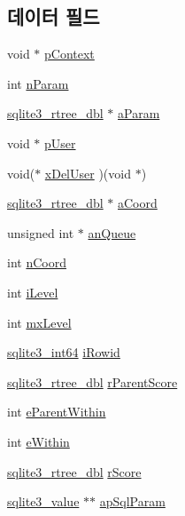 \subsection*{데이터 필드}
\begin{DoxyCompactItemize}
\item 
void $\ast$ \hyperlink{structsqlite3__rtree__query__info_a21e4964ceeddedce2211c8a75067936d}{p\+Context}
\item 
int \hyperlink{structsqlite3__rtree__query__info_a9df4acb109f572455c8e2fb443027157}{n\+Param}
\item 
\hyperlink{sqlite3_8h_ae9156ff58620c1ceae9391f1afabae1b}{sqlite3\+\_\+rtree\+\_\+dbl} $\ast$ \hyperlink{structsqlite3__rtree__query__info_a61352eac82151fee3e4c7ff718612179}{a\+Param}
\item 
void $\ast$ \hyperlink{structsqlite3__rtree__query__info_a7c1d4f1f20c14b88c4dc02643e6706a0}{p\+User}
\item 
void($\ast$ \hyperlink{structsqlite3__rtree__query__info_a23bcc6df883995d42d65449a27f45f85}{x\+Del\+User} )(void $\ast$)
\item 
\hyperlink{sqlite3_8h_ae9156ff58620c1ceae9391f1afabae1b}{sqlite3\+\_\+rtree\+\_\+dbl} $\ast$ \hyperlink{structsqlite3__rtree__query__info_a9d6e605e62fcf49d57dfc0d192076542}{a\+Coord}
\item 
unsigned int $\ast$ \hyperlink{structsqlite3__rtree__query__info_ace9f952557eb7b0e050d879ebb80905a}{an\+Queue}
\item 
int \hyperlink{structsqlite3__rtree__query__info_aa4b95a36fe7306e17e8cf9329fcb0964}{n\+Coord}
\item 
int \hyperlink{structsqlite3__rtree__query__info_af91ca2d5f867b3b0aa9c91920a3b5b45}{i\+Level}
\item 
int \hyperlink{structsqlite3__rtree__query__info_ac84533734fb4c86c3f2deba904118785}{mx\+Level}
\item 
\hyperlink{sqlite3_8h_a0a4d3e6c1ad46f90e746b920ab6ca0d2}{sqlite3\+\_\+int64} \hyperlink{structsqlite3__rtree__query__info_a9e43489993c8aeace851f86eaa00ec26}{i\+Rowid}
\item 
\hyperlink{sqlite3_8h_ae9156ff58620c1ceae9391f1afabae1b}{sqlite3\+\_\+rtree\+\_\+dbl} \hyperlink{structsqlite3__rtree__query__info_af7da93e7fc405eec7e7ec90ab237eab2}{r\+Parent\+Score}
\item 
int \hyperlink{structsqlite3__rtree__query__info_a8bd37c6af5427c35830f674a4db682c3}{e\+Parent\+Within}
\item 
int \hyperlink{structsqlite3__rtree__query__info_ad1038309f7ea55472a7ff99bf4f9d514}{e\+Within}
\item 
\hyperlink{sqlite3_8h_ae9156ff58620c1ceae9391f1afabae1b}{sqlite3\+\_\+rtree\+\_\+dbl} \hyperlink{structsqlite3__rtree__query__info_af449e4a3607573d17b3d31c67b6e1584}{r\+Score}
\item 
\hyperlink{sqlite3_8h_ac2fa1ecdb2290d9af6010edbd1cbc83c}{sqlite3\+\_\+value} $\ast$$\ast$ \hyperlink{structsqlite3__rtree__query__info_a57ccb3cce45dd946e5184b5addeb0326}{ap\+Sql\+Param}
\end{DoxyCompactItemize}



